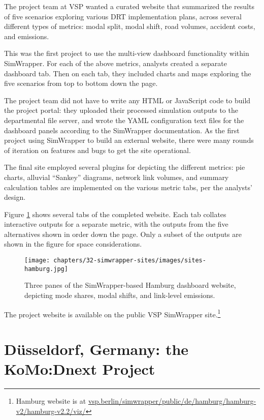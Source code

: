 The project team at VSP wanted a curated website that summarized the results of five scenarios exploring various \gls{DRT} implementation plans, across several different types of metrics: modal split, modal shift, road volumes, accident costs, and emissions.

This was the first project to use the multi-view dashboard functionality within SimWrapper. For each of the above metrics, analysts created a separate dashboard tab. Then on each tab, they included charts and maps exploring the five scenarios from top to bottom down the page.

The project team did not have to write any HTML or JavaScript code to build the project portal: they uploaded their processed simulation outputs to the departmental file server, and wrote the YAML configuration text files for the dashboard panels according to the SimWrapper documentation. As the first project using SimWrapper to build an external website, there were many rounds of iteration on features and bugs to get the site operational.

The final site employed several plugins for depicting the different metrics: pie charts, alluvial ``Sankey'' diagrams, network link volumes, and summary calculation tables are implemented on the various metric tabs, per the analysts' design.

Figure \ref{fig:sites-hamburg} shows several tabs of the completed website. Each tab collates interactive outputs for a separate metric, with the outputs from the five alternatives shown in order down the page. Only a subset of the outputs are shown in the figure for space considerations.

\begin{figure}[ht]
  \centering
  \texttt{[image: chapters/32-simwrapper-sites/images/sites-hamburg.jpg]}
  \caption{Three panes of the SimWrapper-based Hamburg dashboard website, depicting mode shares, modal shifts, and link-level emissions.}
  \label{fig:sites-hamburg}
\end{figure}

The project website is available on the public VSP SimWrapper site.\footnote{Hamburg website is at \href{https://vsp.berlin/simwrapper/public/de/hamburg/hamburg-v2/hamburg-v2.2/viz/}{vsp.berlin/simwrapper/public/de/hamburg/hamburg-v2/hamburg-v2.2/viz/}}

\section{Düsseldorf, Germany: the KoMo:Dnext Project}
\label{sites-komodnext}

